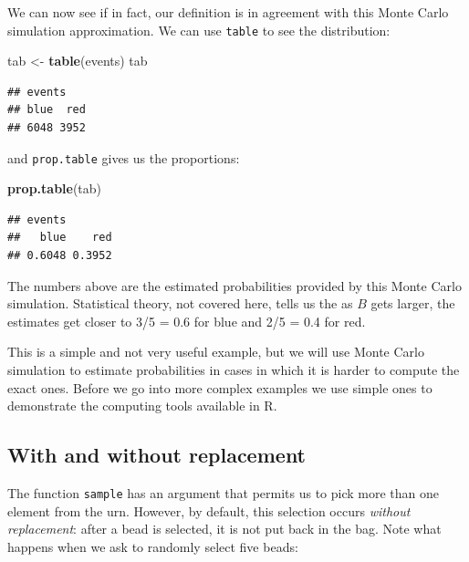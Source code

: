 \documentclass[
  openany]{book}
\newenvironment{Shaded}{\begin{snugshade}}{\end{snugshade}}
\newcommand{\KeywordTok}[1]{\textcolor[rgb]{0.13,0.29,0.53}{\textbf{#1}}}
\newcommand{\NormalTok}[1]{#1}
\newcommand{\StringTok}[1]{\textcolor[rgb]{0.31,0.60,0.02}{#1}}
\begin{document}
We can now see if in fact, our definition is in agreement with this Monte Carlo simulation approximation. We can use \texttt{table} to see the distribution:

\begin{Shaded}
\begin{Highlighting}[]
\NormalTok{tab <-}\StringTok{ }\KeywordTok{table}\NormalTok{(events)}
\NormalTok{tab}
\end{Highlighting}
\end{Shaded}

\begin{verbatim}
## events
## blue  red 
## 6048 3952
\end{verbatim}

and \texttt{prop.table} gives us the proportions:

\begin{Shaded}
\begin{Highlighting}[]
\KeywordTok{prop.table}\NormalTok{(tab)}
\end{Highlighting}
\end{Shaded}

\begin{verbatim}
## events
##   blue    red 
## 0.6048 0.3952
\end{verbatim}

The numbers above are the estimated probabilities provided by this Monte Carlo simulation. Statistical theory, not covered here, tells us the as \(B\) gets larger, the estimates get closer to 3/5 = 0.6 for blue and 2/5 = 0.4 for red.

This is a simple and not very useful example, but we will use Monte Carlo simulation to estimate probabilities in cases in which it is harder to compute the exact ones. Before we go into more complex examples we use simple ones to demonstrate the computing tools available in R.

\hypertarget{with-and-without-replacement}{%
\subsection{With and without replacement}\label{with-and-without-replacement}}

The function \texttt{sample} has an argument that permits us to pick more than one element from the urn. However, by default, this selection occurs \emph{without replacement}: after a bead is selected, it is not put back in the bag. Note what happens when we ask to randomly select five beads:
\end{document}
